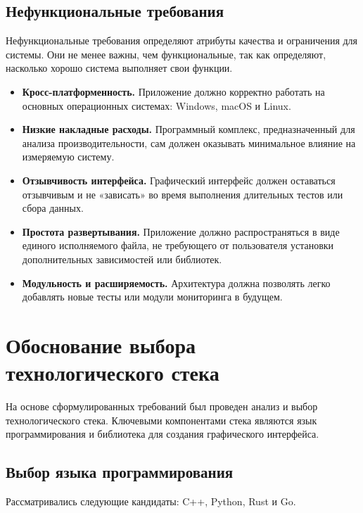 \subsection{Нефункциональные требования}

Нефункциональные требования определяют атрибуты качества и ограничения для системы. Они не менее важны, чем функциональные, так как определяют, насколько хорошо система выполняет свои функции.

\begin{itemize}
    \item \textbf{Кросс-платформенность.} Приложение должно корректно работать на основных операционных системах: Windows, macOS и Linux.
    \item \textbf{Низкие накладные расходы.} Программный комплекс, предназначенный для анализа производительности, сам должен оказывать минимальное влияние на измеряемую систему.
    \item \textbf{Отзывчивость интерфейса.} Графический интерфейс должен оставаться отзывчивым и не «зависать» во время выполнения длительных тестов или сбора данных.
    \item \textbf{Простота развертывания.} Приложение должно распространяться в виде единого исполняемого файла, не требующего от пользователя установки дополнительных зависимостей или библиотек.
    \item \textbf{Модульность и расширяемость.} Архитектура должна позволять легко добавлять новые тесты или модули мониторинга в будущем.
\end{itemize}

\section{Обоснование выбора технологического стека}

На основе сформулированных требований был проведен анализ и выбор технологического стека. Ключевыми компонентами стека являются язык программирования и библиотека для создания графического интерфейса.

\subsection{Выбор языка программирования}

Рассматривались следующие кандидаты: C++, Python, Rust и Go.

